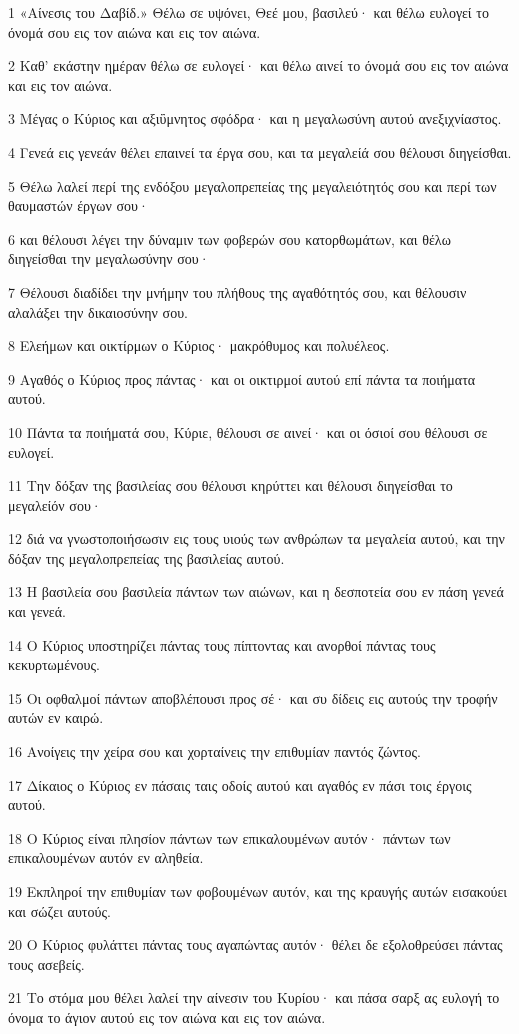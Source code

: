 \par 1 «Αίνεσις του Δαβίδ.» Θέλω σε υψόνει, Θεέ μου, βασιλεύ· και θέλω ευλογεί το όνομά σου εις τον αιώνα και εις τον αιώνα.
\par 2 Καθ' εκάστην ημέραν θέλω σε ευλογεί· και θέλω αινεί το όνομά σου εις τον αιώνα και εις τον αιώνα.
\par 3 Μέγας ο Κύριος και αξιΰμνητος σφόδρα· και η μεγαλωσύνη αυτού ανεξιχνίαστος.
\par 4 Γενεά εις γενεάν θέλει επαινεί τα έργα σου, και τα μεγαλείά σου θέλουσι διηγείσθαι.
\par 5 Θέλω λαλεί περί της ενδόξου μεγαλοπρεπείας της μεγαλειότητός σου και περί των θαυμαστών έργων σου·
\par 6 και θέλουσι λέγει την δύναμιν των φοβερών σου κατορθωμάτων, και θέλω διηγείσθαι την μεγαλωσύνην σου·
\par 7 Θέλουσι διαδίδει την μνήμην του πλήθους της αγαθότητός σου, και θέλουσιν αλαλάξει την δικαιοσύνην σου.
\par 8 Ελεήμων και οικτίρμων ο Κύριος· μακρόθυμος και πολυέλεος.
\par 9 Αγαθός ο Κύριος προς πάντας· και οι οικτιρμοί αυτού επί πάντα τα ποιήματα αυτού.
\par 10 Πάντα τα ποιήματά σου, Κύριε, θέλουσι σε αινεί· και οι όσιοί σου θέλουσι σε ευλογεί.
\par 11 Την δόξαν της βασιλείας σου θέλουσι κηρύττει και θέλουσι διηγείσθαι το μεγαλείόν σου·
\par 12 διά να γνωστοποιήσωσιν εις τους υιούς των ανθρώπων τα μεγαλεία αυτού, και την δόξαν της μεγαλοπρεπείας της βασιλείας αυτού.
\par 13 Η βασιλεία σου βασιλεία πάντων των αιώνων, και η δεσποτεία σου εν πάση γενεά και γενεά.
\par 14 Ο Κύριος υποστηρίζει πάντας τους πίπτοντας και ανορθοί πάντας τους κεκυρτωμένους.
\par 15 Οι οφθαλμοί πάντων αποβλέπουσι προς σέ· και συ δίδεις εις αυτούς την τροφήν αυτών εν καιρώ.
\par 16 Ανοίγεις την χείρα σου και χορταίνεις την επιθυμίαν παντός ζώντος.
\par 17 Δίκαιος ο Κύριος εν πάσαις ταις οδοίς αυτού και αγαθός εν πάσι τοις έργοις αυτού.
\par 18 Ο Κύριος είναι πλησίον πάντων των επικαλουμένων αυτόν· πάντων των επικαλουμένων αυτόν εν αληθεία.
\par 19 Εκπληροί την επιθυμίαν των φοβουμένων αυτόν, και της κραυγής αυτών εισακούει και σώζει αυτούς.
\par 20 Ο Κύριος φυλάττει πάντας τους αγαπώντας αυτόν· θέλει δε εξολοθρεύσει πάντας τους ασεβείς.
\par 21 Το στόμα μου θέλει λαλεί την αίνεσιν του Κυρίου· και πάσα σαρξ ας ευλογή το όνομα το άγιον αυτού εις τον αιώνα και εις τον αιώνα.

